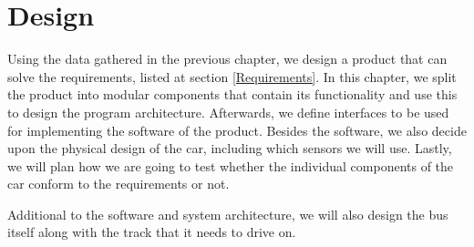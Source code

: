 \chapter{Design}

Using the data gathered in the previous chapter, we design a product that can solve the requirements, listed at section \ref{Requirements}. In this chapter, we split the product into modular components that contain its functionality and use this to design the program architecture. Afterwards, we define interfaces to be used for implementing the software of the product. Besides the software, we also decide upon the physical design of the car, including which sensors we will use. Lastly, we will plan how we are going to test whether the individual components of the car conform to the requirements or not.






Additional to the software and system architecture, we will also design the bus itself along with the track that it needs to drive on. 


